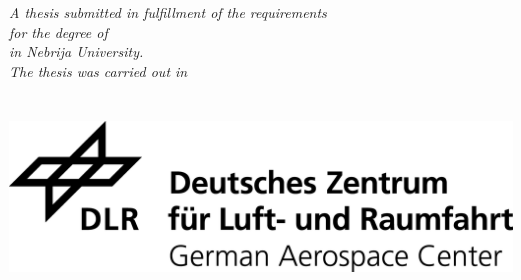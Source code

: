 \documentclass[
11pt, %
english, %
singlespacing, %
headsepline, %
]{MastersDoctoralThesis} %
\theoremstyle{definition}
\theoremstyle{remark}
\theoremstyle{theorem}
\theoremstyle{corollary}
\begin{document}
\begin{titlepage}
\begin{center}
\vfill

\large \textit{A thesis submitted in fulfillment of the requirements \\ for the degree of \degreename \\ in Nebrija University.}\\[0.3cm] %
\textit{The thesis was carried out in}\\[0.4cm]
\groupname\\\deptname\\[1cm] %
\vfill
\includegraphics[scale=0.65]{logos/DLR_Logo_EN_schwarz.png} %

\vfill
\end{center}
\end{titlepage}

\end{document}
